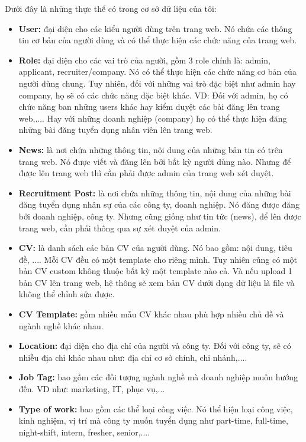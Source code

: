 Dưới đây là những thực thể có trong cơ sở dữ liệu của tôi:

\begin{itemize}
    \item \textbf{User:} đại diện cho các kiểu người dùng trên trang web. Nó chứa các thông tin cơ bản của người dùng và có thể thực hiện các chức năng của trang web.
    \item \textbf{Role:} đại diện cho các vai trò của người, gồm 3 role chính là: admin, applicant, recruiter/company.  Nó có thể thực hiện các chức năng cơ bản của người dùng chung. Tuy nhiên, đối với những vai trò đặc biệt như admin hay company, họ sẽ có các chức năng đặc biệt khác. VD: Đối với admin, họ có chức năng ban những users khác hay kiểm duyệt các bài đăng lên trang web,.... Hay với những doanh nghiệp (company) họ có thể thực hiện đăng những bài đăng tuyển dụng nhân viên lên trang web.
    \item \textbf{News:} là nơi chứa những thông tin, nội dung của những bản tin có trên trang web. Nó được viết và đăng lên bởi bất kỳ người dùng nào. Nhưng để được lên trang web thì cần phải được admin của trang web xét duyệt.
    \item \textbf{Recruitment Post:} là nơi chứa những thông tin, nội dung của những bài đăng tuyển dụng nhân sự của các công ty, doanh nghiệp. Nó đăng được đăng bởi doanh nghiệp, công ty. Nhưng cũng giống như tin tức (news), để lên được trang web, cần phải thông qua sự xét duyệt của admin.
    \item \textbf{CV:} là danh sách các bản CV của người dùng. Nó bao gồm: nội dung, tiêu đề, .... Mỗi CV đều có một template cho riêng mình. Tuy nhiên cũng có một bản CV custom không thuộc bất kỳ một template nào cả. Và nếu upload 1 bản CV lên trang web, hệ thông sẽ xem bản CV dưới dạng dữ liệu là file và không thể chỉnh sửa được.
    \item \textbf{CV Template:} gồm nhiều mẫu CV khác nhau phù hợp nhiều chủ đề và ngành nghề khác nhau.
    \item \textbf{Location:} đại diện cho địa chỉ của người và công ty. Đối với công ty, sẽ có nhiều địa chỉ khác nhau như: địa chỉ cơ sở chính, chi nhánh,....
    \item \textbf{Job Tag:} bao gồm các đối tượng ngành nghề mà doanh nghiệp muốn hướng đến. VD như: marketing, IT, phục vụ,... 
    \item \textbf{Type of work:} bao gồm các thể loại công việc. Nó thể hiện loại công việc, kinh nghiệm, vị trí mà công ty muốn tuyển dụng như part-time, full-time, night-shift, intern, fresher, senior,....
\end{itemize}


